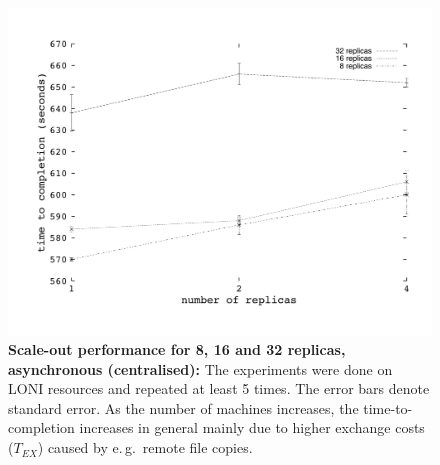 \documentclass{rspublic}
\newcommand{\jhanote}[1]{ {\textcolor{red} { ***shantenu: #1 }}}
\newcommand{\alnote}[1]{ {\textcolor{blue} { ***andre: #1 }}}
\newcommand{\athotanote}[1]{ {\textcolor{green} { ***athota: #1 }}}
\newcommand{\alnote}[1]{}
\newcommand{\athotanote}[1]{}
\newcommand{\jhanote}[1]{}
\begin{document}

\begin{figure}%
\centering
\includegraphics[scale=0.35]{../data/cent_scaleout.pdf}\qquad
\caption{\textbf{Scale-out performance for 8, 16 and 32 replicas, asynchronous (centralised):} 
   The experiments were done on LONI resources and repeated at least 5 times. The error bars denote standard error. As the number of machines increases, the time-to-completion increases in general mainly
  due to higher exchange costs ($T_{EX}$) caused by e.\,g.\  remote file copies.}
\label{fig:scaleout_cent}


\end{figure}
\end{document}
